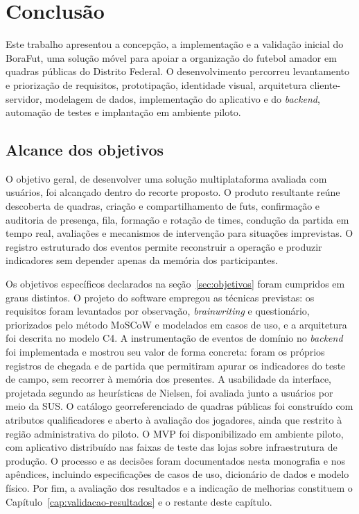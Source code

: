\chapter{Conclusão}
\label{cap:consideracoes-finais}

Este trabalho apresentou a concepção, a implementação e a validação inicial do BoraFut, uma solução móvel para apoiar a organização do futebol amador em quadras públicas do Distrito Federal. O desenvolvimento percorreu levantamento e priorização de requisitos, prototipação, identidade visual, arquitetura cliente-servidor, modelagem de dados, implementação do aplicativo e do \textit{backend}, automação de testes e implantação em ambiente piloto.


\section{Alcance dos objetivos}
O objetivo geral, de desenvolver uma solução multiplataforma avaliada com usuários, foi alcançado dentro do recorte proposto. O produto resultante reúne descoberta de quadras, criação e compartilhamento de futs, confirmação e auditoria de presença, fila, formação e rotação de times, condução da partida em tempo real, avaliações e mecanismos de intervenção para situações imprevistas. O registro estruturado dos eventos permite reconstruir a operação e produzir indicadores sem depender apenas da memória dos participantes.

Os objetivos específicos declarados na seção~\ref{sec:objetivos} foram cumpridos em graus distintos. O projeto do software empregou as técnicas previstas: os requisitos foram levantados por observação, \textit{brainwriting} e questionário, priorizados pelo método MoSCoW e modelados em casos de uso, e a arquitetura foi descrita no modelo C4. A instrumentação de eventos de domínio no \textit{backend} foi implementada e mostrou seu valor de forma concreta: foram os próprios registros de chegada e de partida que permitiram apurar os indicadores do teste de campo, sem recorrer à memória dos presentes. A usabilidade da interface, projetada segundo as heurísticas de Nielsen, foi avaliada junto a usuários por meio da SUS. O catálogo georreferenciado de quadras públicas foi construído com atributos qualificadores e aberto à avaliação dos jogadores, ainda que restrito à região administrativa do piloto. O MVP foi disponibilizado em ambiente piloto, com aplicativo distribuído nas faixas de teste das lojas sobre infraestrutura de produção. O processo e as decisões foram documentados nesta monografia e nos apêndices, incluindo especificações de casos de uso, dicionário de dados e modelo físico. Por fim, a avaliação dos resultados e a indicação de melhorias constituem o Capítulo~\ref{cap:validacao-resultados} e o restante deste capítulo.

